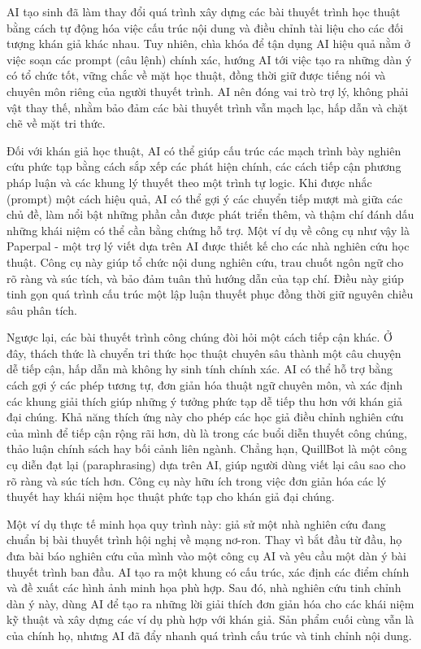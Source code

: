 AI tạo sinh đã làm thay đổi quá trình xây dựng các bài thuyết trình học thuật bằng cách tự động hóa việc cấu trúc nội dung và điều chỉnh tài liệu cho các đối tượng khán giả khác nhau. Tuy nhiên, chìa khóa để tận dụng AI hiệu quả nằm ở việc soạn các prompt (câu lệnh) chính xác, hướng AI tới việc tạo ra những dàn ý có tổ chức tốt, vững chắc về mặt học thuật, đồng thời giữ được tiếng nói và chuyên môn riêng của người thuyết trình. AI nên đóng vai trò trợ lý, không phải vật thay thế, nhằm bảo đảm các bài thuyết trình vẫn mạch lạc, hấp dẫn và chặt chẽ về mặt tri thức.

Đối với khán giả học thuật, AI có thể giúp cấu trúc các mạch trình bày nghiên cứu phức tạp bằng cách sắp xếp các phát hiện chính, các cách tiếp cận phương pháp luận và các khung lý thuyết theo một trình tự logic. Khi được nhắc (prompt) một cách hiệu quả, AI có thể gợi ý các chuyển tiếp mượt mà giữa các chủ đề, làm nổi bật những phần cần được phát triển thêm, và thậm chí đánh dấu những khái niệm có thể cần bằng chứng hỗ trợ. Một ví dụ về công cụ như vậy là Paperpal - một trợ lý viết dựa trên AI được thiết kế cho các nhà nghiên cứu học thuật. Công cụ này giúp tổ chức nội dung nghiên cứu, trau chuốt ngôn ngữ cho rõ ràng và súc tích, và bảo đảm tuân thủ hướng dẫn của tạp chí. Điều này giúp tinh gọn quá trình cấu trúc một lập luận thuyết phục đồng thời giữ nguyên chiều sâu phân tích.

Ngược lại, các bài thuyết trình công chúng đòi hỏi một cách tiếp cận khác. Ở đây, thách thức là chuyển tri thức học thuật chuyên sâu thành một câu chuyện dễ tiếp cận, hấp dẫn mà không hy sinh tính chính xác. AI có thể hỗ trợ bằng cách gợi ý các phép tương tự, đơn giản hóa thuật ngữ chuyên môn, và xác định các khung giải thích giúp những ý tưởng phức tạp dễ tiếp thu hơn với khán giả đại chúng. Khả năng thích ứng này cho phép các học giả điều chỉnh nghiên cứu của mình để tiếp cận rộng rãi hơn, dù là trong các buổi diễn thuyết công chúng, thảo luận chính sách hay bối cảnh liên ngành. Chẳng hạn, QuillBot là một công cụ diễn đạt lại (paraphrasing) dựa trên AI, giúp người dùng viết lại câu sao cho rõ ràng và súc tích hơn. Công cụ này hữu ích trong việc đơn giản hóa các lý thuyết hay khái niệm học thuật phức tạp cho khán giả đại chúng.

Một ví dụ thực tế minh họa quy trình này: giả sử một nhà nghiên cứu đang chuẩn bị bài thuyết trình hội nghị về mạng nơ-ron. Thay vì bắt đầu từ đầu, họ đưa bài báo nghiên cứu của mình vào một công cụ AI và yêu cầu một dàn ý bài thuyết trình ban đầu. AI tạo ra một khung có cấu trúc, xác định các điểm chính và đề xuất các hình ảnh minh họa phù hợp. Sau đó, nhà nghiên cứu tinh chỉnh dàn ý này, dùng AI để tạo ra những lời giải thích đơn giản hóa cho các khái niệm kỹ thuật và xây dựng các ví dụ phù hợp với khán giả. Sản phẩm cuối cùng vẫn là của chính họ, nhưng AI đã đẩy nhanh quá trình cấu trúc và tinh chỉnh nội dung.

